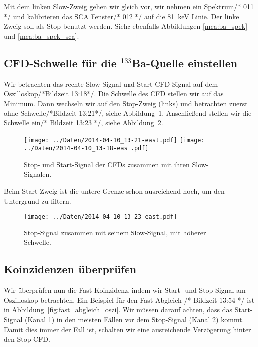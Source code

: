 Mit dem linken Slow-Zweig gehen wir gleich vor, wir nehmen ein Spektrum/* 011
*/ und kalibrieren das SCA Fenster/* 012 */ auf die \SI{81}{\kilo\electronvolt}
Linie. Der linke Zweig soll als Stop benutzt werden. Siehe ebenfalls Abbildungen \ref{mca:ba_spek} und \ref{mca:ba_spek_sca}.

\subsection{CFD-Schwelle für die ${}^{133}$Ba-Quelle einstellen}

Wir betrachten das rechte Slow-Signal und Start-CFD-Signal auf dem
Oszilloskop/*Bildzeit 13:18*/. Die Schwelle des CFD stellen wir auf das
Minimum. Dann wechseln wir auf den Stop-Zweig (links) und betrachten zuerst
ohne Schwelle/*Bildzeit 13:21*/, siehe
Abbildung~\ref{fig:ba_start_slow_baseline}. Anschließend stellen wir die
Schwelle ein/* Bildzeit 13:23 */, siehe Abbildung~\ref{fig:ba_start_slow}.

\begin{figure}[htbp]
    \centering
    \texttt{[image: ../Daten/2014-04-10\_13-21-east.pdf]}
    \hfill
    \texttt{[image: ../Daten/2014-04-10\_13-18-east.pdf]}
    \caption{%
        Stop- und Start-Signal der CFDs zusammen mit ihren Slow-Signalen.
    }
    \label{fig:ba_start_slow_baseline}
\end{figure}

Beim Start-Zweig ist die untere Grenze schon ausreichend hoch, um den
Untergrund zu filtern.

\begin{figure}[htbp]
    \centering
    \texttt{[image: ../Daten/2014-04-10\_13-23-east.pdf]}
    \caption{%
        Stop-Signal zusammen mit seinem Slow-Signal, mit höherer Schwelle.
    }
    \label{fig:ba_start_slow}
\end{figure}

\subsection{Koinzidenzen überprüfen}

Wir überprüfen nun die Fast-Koinzidenz, indem wir Start- und Stop-Signal am
Oszilloskop betrachten. Ein Beispiel für den Fast-Abgleich /* Bildzeit 13:54 */
ist in Abbildung~\ref{fig:fast_abgleich_oszi}. Wir müssen darauf achten, dass
das Start-Signal (Kanal 1) in den meisten Fällen vor dem Stop-Signal (Kanal 2)
kommt. Damit dies immer der Fall ist, schalten wir eine ausreichende
Verzögerung hinter den Stop-CFD.

